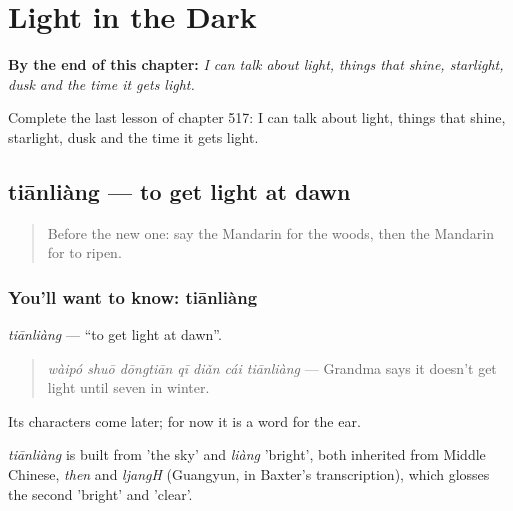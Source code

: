 
\chapter{Light in the Dark}
\label{ch:zh-light-in-the-dark}

\begin{chapteropening}
\textbf{By the end of this chapter:} \emph{I can talk about light, things that shine, starlight, dusk and the time it gets light.}

Complete the last lesson of chapter 517: I can talk about light, things that shine, starlight, dusk and the time it gets light.
\end{chapteropening}

\section[tiānliàng]{tiānliàng — to get light at dawn}

\label{lesson:ZH-C517-tianliang}



\begin{quote}
Before the new one: say the Mandarin for the woods, then the Mandarin for to ripen.
\end{quote}

\subsection*{You'll want to know: tiānliàng}
\emph{tiānliàng} — \textquotedblleft{}to get light at dawn\textquotedblright{}.

\begin{quote}
\emph{wàipó shuō dōngtiān qī diǎn cái tiānliàng} — Grandma says it doesn't get light until seven in winter.
\end{quote}

Its characters come later; for now it is a word for the ear.

\begin{cousinweb}
\emph{tiānliàng} is built from  'the sky' and \emph{liàng} 'bright', both inherited from Middle Chinese, \emph{then} and \emph{ljangH} (Guangyun, in Baxter's transcription), which glosses the second 'bright' and 'clear'.
\end{cousinweb}

